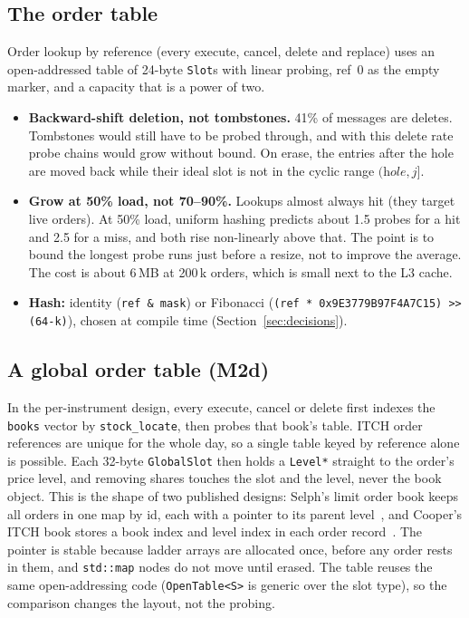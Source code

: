 \documentclass[10pt,a4paper]{article}
\newcommand{\code}[1]{\texttt{#1}}
\begin{document}
\subsection{The order table}
Order lookup by reference (every execute, cancel, delete and replace) uses an open-addressed table of 24-byte
\code{Slot}s with linear probing, ref~0 as the empty marker, and a capacity that is a power of two.
\begin{itemize}
  \item \textbf{Backward-shift deletion, not tombstones.} 41\% of messages are deletes. Tombstones would still have to be probed through,
        and with this delete rate probe chains would grow without bound. On erase, the entries after the hole are moved back while their
        ideal slot is not in the cyclic range $(\textit{hole}, j]$.
  \item \textbf{Grow at 50\% load, not 70--90\%.} Lookups almost always hit (they target live orders). At 50\% load, uniform hashing predicts about 1.5
        probes for a hit and 2.5 for a miss, and both rise non-linearly above that. The point is to bound the longest probe runs just before a resize, not to improve the average.
        The cost is about 6\,MB at 200\,k orders, which is small next to the L3 cache.
  \item \textbf{Hash:} identity (\code{ref \& mask}) or Fibonacci (\code{(ref * 0x9E3779B97F4A7C15) >> (64-k)}), chosen at compile time
        (Section~\ref{sec:decisions}).
\end{itemize}

\subsection{A global order table (M2d)}
In the per-instrument design, every execute, cancel or delete first indexes the \code{books} vector by \code{stock\_locate}, then probes that book's table.
ITCH order references are unique for the whole day, so a single table keyed by reference alone is possible.
Each 32-byte \code{GlobalSlot} then holds a \code{Level*} straight to the order's price level, and removing shares touches the slot and the level, never the book object.
This is the shape of two published designs: Selph's limit order book keeps all orders in one map by id, each with a pointer to its parent level~\cite{selph},
and Cooper's ITCH book stores a book index and level index in each order record~\cite{cooper}.
The pointer is stable because ladder arrays are allocated once, before any order rests in them, and \code{std::map} nodes do not move until erased.
The table reuses the same open-addressing code (\code{OpenTable<S>} is generic over the slot type), so the comparison changes the layout, not the probing.
\end{document}
